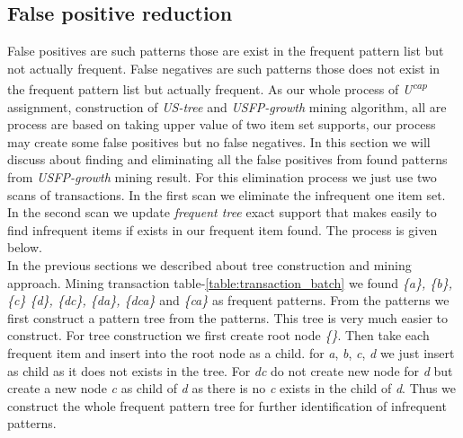     \subsection{False positive reduction}
    False positives are such patterns those are exist in the frequent pattern list but not actually frequent. False negatives are such patterns those does not exist in the frequent pattern list but actually frequent. As our whole process of \emph{U\textsuperscript{cap}} assignment, construction of \emph{US-tree} and \emph{USFP-growth} mining algorithm, all are process are based on taking upper value of two item set supports, our process may create some false positives but no false negatives. In this section we will discuss about finding and eliminating all the false positives from found patterns from \emph{USFP-growth} mining result. For this elimination process we just use two scans of transactions. In the first scan we eliminate the infrequent one item set. In the second scan we update \emph{frequent tree} exact support that makes easily to find infrequent items if exists in our frequent item found. The process is given below.\\
    In the previous sections we described about tree construction and mining approach. Mining transaction table-\ref{table:transaction_batch} we found \emph{\{a\}, \{b\}, \{c\} \{d\}, \{dc\}, \{da\}, \{dca\}} and \emph{\{ca\}} as frequent patterns. From the patterns we first construct a pattern tree from the patterns. This tree is very much easier to construct. For tree construction we first create root node \emph{\{\}}. Then take each frequent item and insert into the root node as a child. for \emph{a}, \emph{b}, \emph{c}, \emph{d} we just insert as child as it does not exists in the tree. For \emph{dc} do not create new node for \emph{d} but create a new node \emph{c} as child of \emph{d} as there is no \emph{c} exists in the child of \emph{d}. Thus we construct the whole frequent pattern tree for further identification of infrequent patterns. \\
